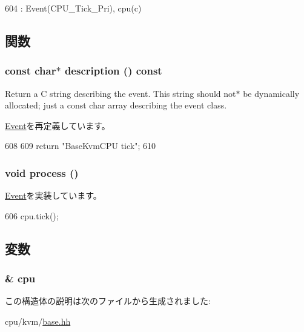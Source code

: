 \begin{DoxyCode}
604             : Event(CPU_Tick_Pri), cpu(c) {}
\end{DoxyCode}


\subsection{関数}
\hypertarget{structBaseKvmCPU_1_1TickEvent_a2bd90422eece9190794479e08092a252}{
\subsubsection[{description}]{\setlength{\rightskip}{0pt plus 5cm}const char$\ast$ description () const}}
\label{structBaseKvmCPU_1_1TickEvent_a2bd90422eece9190794479e08092a252}
Return a C string describing the event. This string should not$\ast$ be dynamically allocated; just a const char array describing the event class. 

\hyperlink{classEvent_a130ddddf003422b413e2e891b1b80e8f}{Event}を再定義しています。


\begin{DoxyCode}
608                                         {
609             return "BaseKvmCPU tick";
610         }
\end{DoxyCode}
\hypertarget{structBaseKvmCPU_1_1TickEvent_a2e9c5136d19b1a95fc427e0852deab5c}{
\subsubsection[{process}]{\setlength{\rightskip}{0pt plus 5cm}void process ()}}
\label{structBaseKvmCPU_1_1TickEvent_a2e9c5136d19b1a95fc427e0852deab5c}


\hyperlink{classEvent_a142b75b68a6291400e20fb0dd905b1c8}{Event}を実装しています。


\begin{DoxyCode}
606 { cpu.tick(); }
\end{DoxyCode}


\subsection{変数}
\hypertarget{structBaseKvmCPU_1_1TickEvent_ad3132ce2aaba599747054be6dd41e0b8}{
\subsubsection[{cpu}]{\& {\bf cpu}}}
\label{structBaseKvmCPU_1_1TickEvent_ad3132ce2aaba599747054be6dd41e0b8}


この構造体の説明は次のファイルから生成されました:\begin{DoxyCompactItemize}
\item 
cpu/kvm/\hyperlink{cpu_2kvm_2base_8hh}{base.hh}\end{DoxyCompactItemize}
